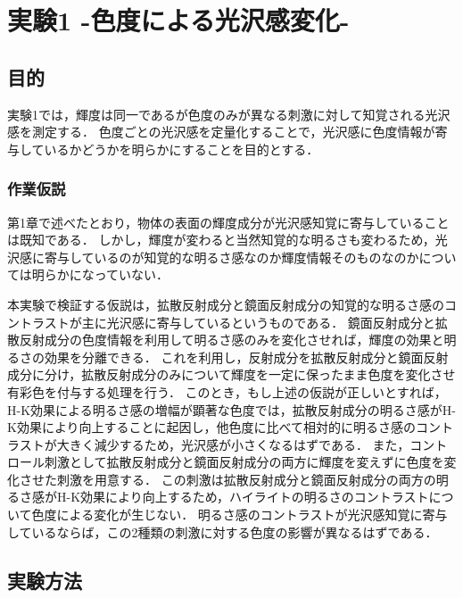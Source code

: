 \chapter{実験1 -色度による光沢感変化-}

    \section{目的}
        実験1では，輝度は同一であるが色度のみが異なる刺激に対して知覚される光沢感を測定する．
        色度ごとの光沢感を定量化することで，光沢感に色度情報が寄与しているかどうかを明らかにすることを目的とする．

        \subsection{作業仮説}
            第1章で述べたとおり，物体の表面の輝度成分が光沢感知覚に寄与していることは既知である．
            しかし，輝度が変わると当然知覚的な明るさも変わるため，光沢感に寄与しているのが知覚的な明るさ感なのか輝度情報そのものなのかについては明らかになっていない．

            本実験で検証する仮説は，拡散反射成分と鏡面反射成分の知覚的な明るさ感のコントラストが主に光沢感に寄与しているというものである．
            鏡面反射成分と拡散反射成分の色度情報を利用して明るさ感のみを変化させれば，輝度の効果と明るさの効果を分離できる．
            これを利用し，反射成分を拡散反射成分と鏡面反射成分に分け，拡散反射成分のみについて輝度を一定に保ったまま色度を変化させ有彩色を付与する処理を行う．
            このとき，もし上述の仮説が正しいとすれば，H-K効果による明るさ感の増幅が顕著な色度では，拡散反射成分の明るさ感がH-K効果により向上することに起因し，他色度に比べて相対的に明るさ感のコントラストが大きく減少するため，光沢感が小さくなるはずである．
            また，コントロール刺激として拡散反射成分と鏡面反射成分の両方に輝度を変えずに色度を変化させた刺激を用意する．
            この刺激は拡散反射成分と鏡面反射成分の両方の明るさ感がH-K効果により向上するため，ハイライトの明るさのコントラストについて色度による変化が生じない．
            明るさ感のコントラストが光沢感知覚に寄与しているならば，この2種類の刺激に対する色度の影響が異なるはずである．

    \section{実験方法}
